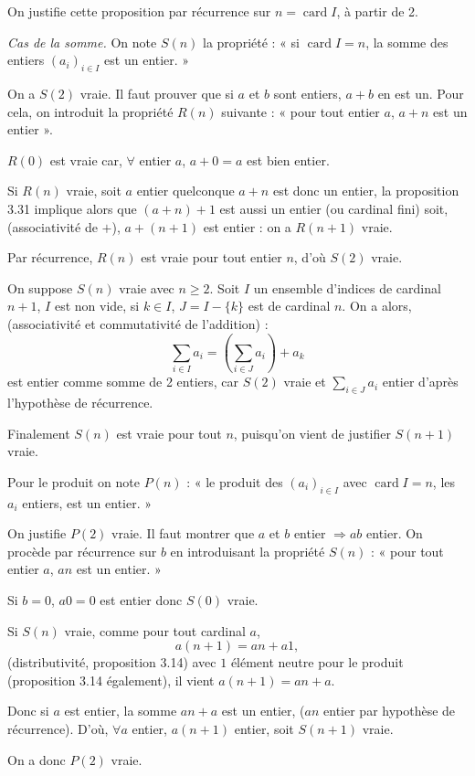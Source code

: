 On justifie cette proposition par récurrence sur $n=\operatorname{card}I$, à partir de 2.

\emph{Cas de la somme.} On note $S(n)$ la propriété : « si $\operatorname{card}I=n$, la somme des entiers $(a_i)_{i\in I}$ est un entier. »

On a $S(2)$ vraie. Il faut prouver que si $a$ et $b$ sont entiers, $a+b$ en est un. Pour cela, on introduit la propriété $R(n)$ suivante : « pour tout entier $a$, $a+n$ est un entier ».

$R(0)$ est vraie car, $\forall$ entier $a$, $a+0=a$ est bien entier.

Si $R(n)$ vraie, soit $a$ entier quelconque $a+n$ est donc un entier, la proposition 3.31 implique alors que $(a+n)+1$ est aussi un entier (ou cardinal fini) soit, (associativité de $+$), $a+(n+1)$ est entier : on a $R(n+1)$ vraie.

Par récurrence, $R(n)$ est vraie pour tout entier $n$, d'où $S(2)$ vraie.

On suppose $S(n)$ vraie avec $n\ge2$. Soit $I$ un ensemble d'indices de cardinal $n+1$, $I$ est non vide, si $k\in I$, $J=I-\{k\}$ est de cardinal $n$. On a alors, (associativité et commutativité de l'addition) :
\[
\sum_{i\in I}a_i=\left(\sum_{i\in J}a_i\right)+a_k
\]
est entier comme somme de 2 entiers, car $S(2)$ vraie et $\sum_{i\in J}a_i$ entier d'après l'hypothèse de récurrence.

Finalement $S(n)$ est vraie pour tout $n$, puisqu'on vient de justifier $S(n+1)$ vraie.

Pour le produit on note $P(n)$ : « le produit des $(a_i)_{i\in I}$ avec $\operatorname{card}I=n$, les $a_i$ entiers, est un entier. »

On justifie $P(2)$ vraie. Il faut montrer que $a$ et $b$ entier $\Rightarrow ab$ entier. On procède par récurrence sur $b$ en introduisant la propriété $S(n)$ : « pour tout entier $a$, $an$ est un entier. »

Si $b=0$, $a0=0$ est entier donc $S(0)$ vraie.

Si $S(n)$ vraie, comme pour tout cardinal $a$,
\[
a(n+1)=an+a1,
\]
(distributivité, proposition 3.14) avec $1$ élément neutre pour le produit (proposition 3.14 également), il vient $a(n+1)=an+a$.

Donc si $a$ est entier, la somme $an+a$ est un entier, ($an$ entier par hypothèse de récurrence). D'où, $\forall a$ entier, $a(n+1)$ entier, soit $S(n+1)$ vraie.

On a donc $P(2)$ vraie.

